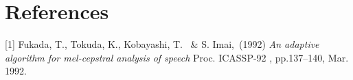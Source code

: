 \section*{References}



\small


[1] Fukada, T., Tokuda, K., Kobayashi, T. \ \& S. Imai,\ (1992) {\it An adaptive algorithm for mel-cepstral 
analysis of speech} Proc. ICASSP-92 , pp.137–140, Mar. 1992.

